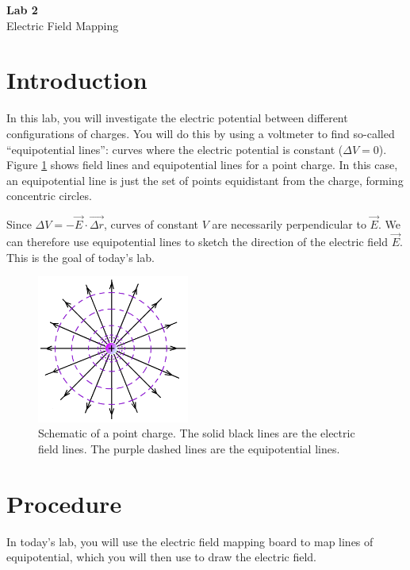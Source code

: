 \documentclass{article}
\begin{document}
\fancyfoot[C]{\thepage}
\vspace*{0cm}
\begin{center}
	{\LARGE \textbf{Lab 2}}\\
	{\Large Electric Field Mapping}
\end{center}

\section*{Introduction}
In this lab, you will investigate the electric potential between different configurations of charges. You will do this by using a voltmeter to find so-called ``equipotential lines'': curves where the electric potential is constant ($\Delta V=0$). Figure \ref{fig::equipotential} shows field lines and equipotential lines for a point charge. In this case, an equipotential line is just the set of points equidistant from the charge, forming concentric circles. 

Since $\Delta V = -\vec{E}\cdot{\vec{\Delta r}}$, curves of constant $V$ are necessarily perpendicular to $\vec{E}$. We can therefore use equipotential lines to sketch the direction of the electric field $\vec{E}$. This is the goal of today's lab.

\begin{figure}[ht!]
	\centering
	\includegraphics[width=5cm]{equipotential.png}
	\caption{Schematic of a point charge. The solid black lines are the electric field lines. The
		purple dashed lines are the equipotential lines.}
	\label{fig::equipotential}
\end{figure}

\section*{Procedure}
In today's lab, you will use the electric field mapping board to map lines of equipotential, which you will then use to draw the electric field.
\end{document}
